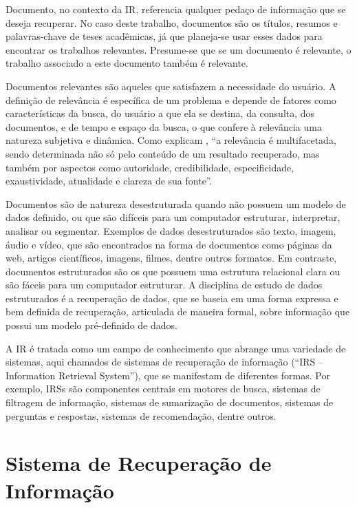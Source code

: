 \documentclass[
	12pt,				%
	openright,			%
	oneside,			%
	a4paper,			%
	english,			%
	french,				%
	spanish,			%
	brazil				%
	]{abntex2}
\begin{document}
Documento, no contexto da IR, referencia qualquer pedaço de informação que se deseja recuperar.
No caso deste trabalho, documentos são os títulos, resumos e palavras-chave de teses acadêmicas, já que planeja-se usar esses dados para encontrar os trabalhos relevantes.
Presume-se que se um documento é relevante, o trabalho associado a este documento também é relevante.

Documentos relevantes são aqueles que satisfazem a necessidade do usuário. \cite{manning2008introduction}
A definição de relevância é específica de um problema e depende de fatores como
características da busca, do usuário a que ela se destina, da consulta, dos documentos, e de
tempo e espaço da busca, o que confere à relevância uma natureza subjetiva e dinâmica.
Como explicam \citeauthor{Ceri2013}, ``a relevância é multifacetada, sendo determinada não só pelo conteúdo de um
resultado recuperado, mas também por aspectos como autoridade, credibilidade, especificidade, exaustividade,
atualidade e clareza de sua fonte''.

Documentos são de natureza desestruturada quando não possuem um modelo de dados definido, ou que são difíceis para um computador
estruturar, interpretar, analisar ou segmentar. \cite{manning2008introduction}
Exemplos de dados desestruturados são texto, imagem, áudio e vídeo, que são encontrados na forma de
documentos como páginas da web, artigos científicos, imagens, filmes, dentre outros formatos.
Em contraste, documentos estruturados são os que possuem uma estrutura relacional clara ou são fáceis para um computador estruturar.
A disciplina de estudo de dados estruturados é a recuperação de dados, que se baseia em uma forma expressa e bem
definida de recuperação, articulada de maneira formal, sobre informação que possui um modelo pré-definido de dados. \cite{JurafskyMartin2023}

A IR é tratada como um campo de conhecimento que abrange uma variedade de
sistemas, aqui chamados de sistemas de recuperação de informação (``IRS -- Information Retrieval System''), que se manifestam de diferentes formas.
Por exemplo, IRSs são componentes centrais em motores de busca,
sistemas de filtragem de informação, sistemas de sumarização de documentos, sistemas de perguntas e respostas,
sistemas de recomendação, dentre outros. \cite{Ceri2013}

\section{Sistema de Recuperação de Informação}\label{sec:sobre-recuperacao-de-informacao}
\end{document}
